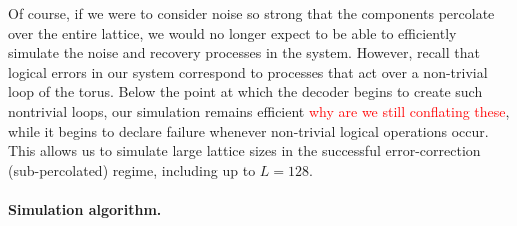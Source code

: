 \documentclass[aps, prl, letterpaper, twocolumn, superscriptaddress, notitlepage, 10pt]{revtex4-1}
\newcommand{\cggb}[1]{\textcolor{blue}{#1}}
\newcommand{\dude}[1]{\textcolor{red}{#1}}
\begin{document}
Of course, if we were to consider noise so strong that 
the components percolate over the entire lattice, we would no 
longer expect to be able to efficiently simulate the noise and recovery processes in the system. 
However, recall that logical errors in our system correspond to 
processes that act over a non-trivial loop of the torus. 
Below the point at which the decoder begins to create 
such nontrivial loops, our simulation remains efficient \dude{why are we still conflating these},
while it begins to declare failure whenever non-trivial logical 
operations occur. This allows us to simulate large lattice sizes 
in the successful error-correction (sub-percolated) regime, including up to $L=128$.

\paragraph{Simulation algorithm.}


\end{document}
